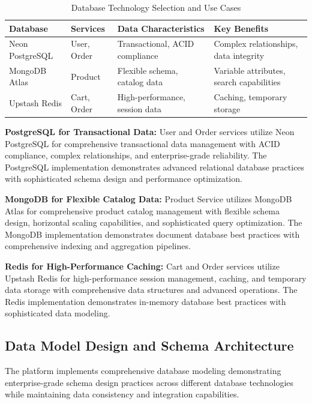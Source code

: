 \begin{table}[H]
\centering
\caption{Database Technology Selection and Use Cases}
\label{tab:database-technology-distribution}
\begin{tabular}{|p{3cm}|p{3cm}|p{4cm}|p{4cm}|}
\hline
\textbf{Database} & \textbf{Services} & \textbf{Data Characteristics} & \textbf{Key Benefits} \\
\hline
Neon PostgreSQL & User, Order & Transactional, ACID compliance & Complex relationships, data integrity \\
\hline
MongoDB Atlas & Product & Flexible schema, catalog data & Variable attributes, search capabilities \\
\hline
Upstash Redis & Cart, Order & High-performance, session data & Caching, temporary storage \\
\hline
\end{tabular}
\end{table}

\textbf{PostgreSQL for Transactional Data:}
User and Order services utilize Neon PostgreSQL for comprehensive transactional data management with ACID compliance, complex relationships, and enterprise-grade reliability. The PostgreSQL implementation demonstrates advanced relational database practices with sophisticated schema design and performance optimization.

\textbf{MongoDB for Flexible Catalog Data:}
Product Service utilizes MongoDB Atlas for comprehensive product catalog management with flexible schema design, horizontal scaling capabilities, and sophisticated query optimization. The MongoDB implementation demonstrates document database best practices with comprehensive indexing and aggregation pipelines.

\textbf{Redis for High-Performance Caching:}
Cart and Order services utilize Upstash Redis for high-performance session management, caching, and temporary data storage with comprehensive data structures and advanced operations. The Redis implementation demonstrates in-memory database best practices with sophisticated data modeling.

\subsection{Data Model Design and Schema Architecture}

The platform implements comprehensive database modeling demonstrating enterprise-grade schema design practices across different database technologies while maintaining data consistency and integration capabilities.

